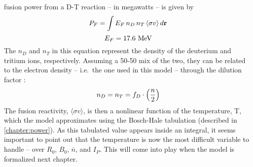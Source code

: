    fusion power from a D-T reaction -- in megawatts -- is given by 
 \begin{equation}
 	\label{eq:pf_int}
 	P_F = \int E_F \, n_D \, n_T \, \langle \sigma v \rangle \, d \vec{\bold{r}}
 \end{equation}
\begin{equation}
	E_F = 17.6 \ \textnormal{MeV}
\end{equation}
 The $n_D$ and $n_T$ in this equation  represent the density of the deuterium and tritium ions, respectively. Assuming a 50-50 mix of the two, they can be related to the electron density -- i.e.\ the one used in this model -- through the dilution factor :
 \begin{equation}
 	n_D = n_T = f_D \cdot \left( \frac{n}{2} \right)
 	 \myequations{Dilution Factor -- $f_{D}$}
 \end{equation}
 The fusion reactivity, $\langle \sigma v \rangle$, is then a nonlinear function of the temperature, T, which the model approximates using the Bosch-Hale tabulation (described in \cref{chapter:power}). As this tabulated value appears inside an integral, it seems important to point out that the temperature is now the most difficult  variable to handle -- over $R_0$, $B_0$, $\overline n$, and $I_P$. This will come into play when the model is formalized next chapter.
 
